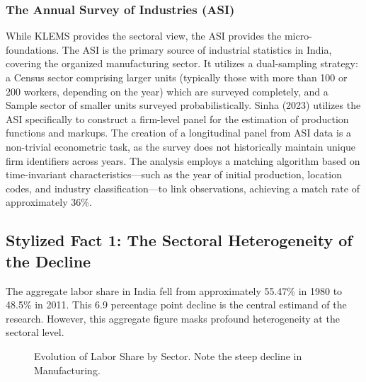 \documentclass[12pt]{article}
\begin{document}
\subsubsection{The Annual Survey of Industries (ASI)}
While KLEMS provides the sectoral view, the ASI provides the micro-foundations. The ASI is the primary source of industrial statistics in India, covering the organized manufacturing sector. It utilizes a dual-sampling strategy: a Census sector comprising larger units (typically those with more than 100 or 200 workers, depending on the year) which are surveyed completely, and a Sample sector of smaller units surveyed probabilistically. Sinha (2023) utilizes the ASI specifically to construct a firm-level panel for the estimation of production functions and markups. The creation of a longitudinal panel from ASI data is a non-trivial econometric task, as the survey does not historically maintain unique firm identifiers across years. The analysis employs a matching algorithm based on time-invariant characteristics—such as the year of initial production, location codes, and industry classification—to link observations, achieving a match rate of approximately 36\%.

\subsection{Stylized Fact 1: The Sectoral Heterogeneity of the Decline}
The aggregate labor share in India fell from approximately 55.47\% in 1980 to 48.5\% in 2011. This 6.9 percentage point decline is the central estimand of the research. However, this aggregate figure masks profound heterogeneity at the sectoral level.

\begin{figure}[H]
\centering
{}
\caption{Evolution of Labor Share by Sector. Note the steep decline in Manufacturing.}
\label{fig:sector_ls}
\end{figure}
\end{document}

